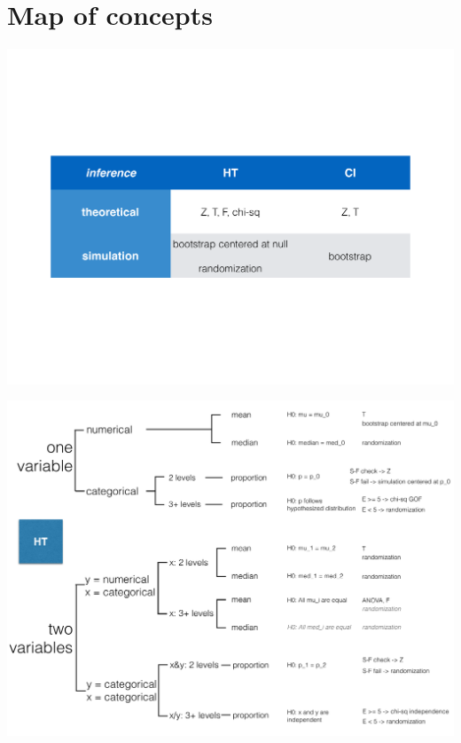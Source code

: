 \documentclass[slidestop,compress,mathserif,12pt,t,professionalfonts,xcolor=table]{beamer}
\begin{document}

\section{Map of concepts}


\begin{frame}

\vfill

\begin{center}
\includegraphics[width=\textwidth]{figures/mt2_review_map1}
\end{center}

\vfill

\end{frame}


\begin{frame}

\begin{center}
\includegraphics[width=\textwidth]{figures/mt2_review_map2}
\end{center}

\end{frame}
\end{document}
